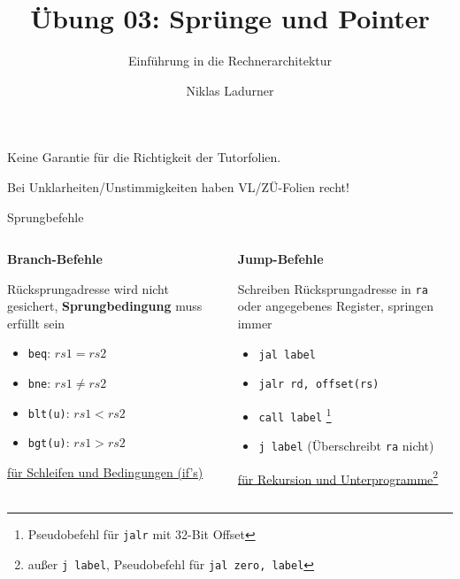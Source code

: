 \documentclass[
  german,            %
  aspectratio=169,    %
]{tumbeamer}
\title{Übung 03: Sprünge und Pointer}
\subtitle{Einführung in die Rechnerarchitektur}
\author{Niklas Ladurner}
\institute{\theChairName\\\theDepartmentName\\\theUniversityName}
\date{\DTMdisplaydate{2025}{10}{31}{-1}}
\begin{document}
\maketitle

\begin{frame}[c]{}{}
	\begin{center}
		\LARGE  Keine Garantie für die Richtigkeit der Tutorfolien.

		\Large Bei Unklarheiten/Unstimmigkeiten haben VL/ZÜ-Folien recht!
	\end{center}
\end{frame}

\begin{frame}[c, fragile]{Sprungbefehle}{}
	\vspace{-0.5cm}
	\begin{columns}
		\begin{column}{0.5\textwidth}
			\begin{center}\textbf{Branch-Befehle}\end{center}
			Rücksprungadresse wird nicht gesichert, \textbf{Sprungbedingung}
			muss erfüllt sein
			\vspace{0.5\baselineskip}
			\begin{itemize}
				\item \verb|beq|: $rs1 = rs2$
				\item \verb|bne|: $rs1 \ne rs2$
				\item \verb|blt(u)|: $rs1 < rs2$
				\item \verb|bgt(u)|: $rs1 > rs2$
			\end{itemize}
			\begin{center}
				\underline{für Schleifen und Bedingungen (if's)}
			\end{center}
		\end{column}
		\begin{column}{0.5\textwidth}
			\begin{center}\textbf{Jump-Befehle}\end{center}
			Schreiben Rücksprungadresse in \texttt{ra} oder angegebenes Register,
			springen immer
			\vspace{0.5\baselineskip}
			\begin{itemize}
				\item \verb|jal label|
				\item \verb|jalr rd, offset(rs)|
				\item \verb|call label| \footnote[frame]{Pseudobefehl für \texttt{jalr} mit 32-Bit Offset}
				\item \verb|j label| (Überschreibt \texttt{ra} nicht)
			\end{itemize}
			\begin{center}
				\underline{für Rekursion und Unterprogramme\footnote[frame]{außer \texttt{j label}, Pseudobefehl für \texttt{jal zero, label}}}
			\end{center}
		\end{column}
	\end{columns}
\end{frame}
\end{document}
